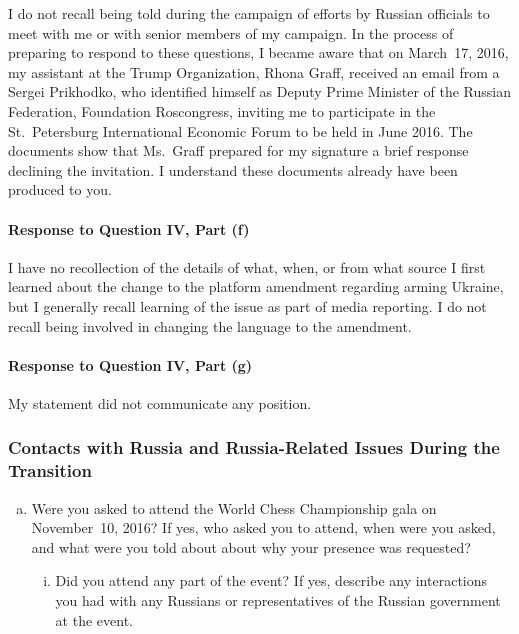 I do not recall being told during the campaign of efforts by Russian officials to meet with me or with senior members of my campaign.
In the process of preparing to respond to these questions, I became aware that on March~17, 2016, my assistant at the Trump Organization, Rhona Graff, received an email from a Sergei Prikhodko, who identified himself as Deputy Prime Minister of the Russian Federation, Foundation Roscongress, inviting me to participate in the St.~Petersburg International Economic Forum to be held in June 2016.
The documents show that Ms.~Graff prepared for my signature a brief response declining the invitation.
I understand these documents already have been produced to you.

\paragraph*{Response to Question IV, Part (f)}

I have no recollection of the details of what, when, or from what source I first learned about the change to the platform amendment regarding arming Ukraine, but I generally recall learning of the issue as part of media reporting.
I do not recall being involved in changing the language to the amendment.

\paragraph*{Response to Question IV, Part (g)}

My statement did not communicate any position.

\subsubsection{Contacts with Russia and Russia-Related Issues During the Transition}

\begin{enumerate}[a.]

\item Were you asked to attend the World Chess Championship gala on November~10, 2016?
If yes, who asked you to attend, when were you asked, and what were you told about about why your presence was requested?

\begin{enumerate}[i.]

\item Did you attend any part of the event?
If yes, describe any interactions you had with any Russians or representatives of the Russian government at the event.

\end{enumerate}

\end{enumerate}

